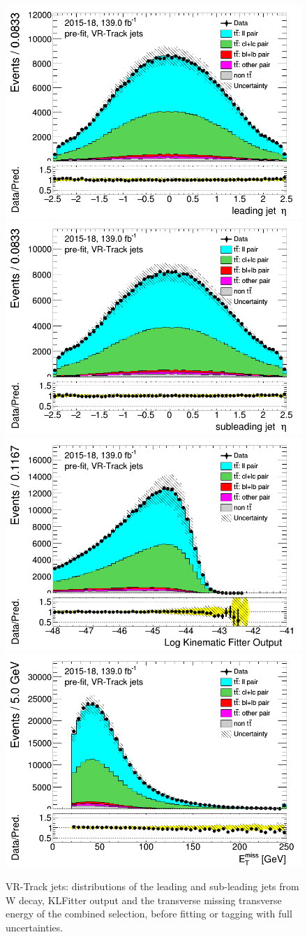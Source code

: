 	
	
	\newpage	
	\begin{figure}[H]
	\includegraphics[width=.45\textwidth]{FTAG_plots/pretagNoRwwithhighpTVRJetsall/DataMC_h_J0_etatrackjet.png}
	\includegraphics[width=.45\textwidth]{FTAG_plots/pretagNoRwwithhighpTVRJetsall/DataMC_h_J1_etatrackjet.png}\\
	\includegraphics[width=.45\textwidth]{FTAG_plots/pretagNoRwwithhighpTVRJetsall/DataMC_h_LLRtrackjet.png}
	\includegraphics[width=.45\textwidth]{FTAG_plots/pretagNoRwwithhighpTVRJetsall/DataMC_h_METtrackjet.png}\\
	
	\caption{VR-Track jets: distributions of the leading and sub-leading jets 
	from W decay, KLFitter output and the transverse missing transverse 
	energy of the combined selection, before fitting or tagging with 
	full uncertainties.} \label{fig:combined_jets_VRJets}
	\end{figure}
	
